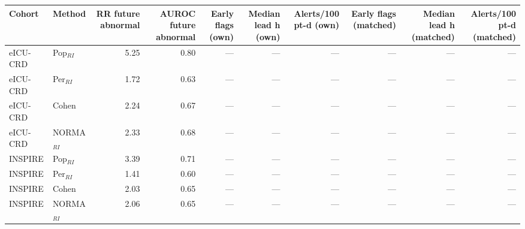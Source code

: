 \begin{table}[ht]
\centering
\scriptsize
\begin{tabular}{llrrrrrrrr}
\toprule
Cohort & Method & RR future abnormal & AUROC future abnormal & Early flags (own) & Median lead h (own) & Alerts/100 pt-d (own) & Early flags (matched) & Median lead h (matched) & Alerts/100 pt-d (matched) \\
\midrule
eICU-CRD & Pop$_{RI}$ & 5.25 & 0.80 & --- & --- & --- & --- & --- & --- \\
eICU-CRD & Per$_{RI}$ & 1.72 & 0.63 & --- & --- & --- & --- & --- & --- \\
eICU-CRD & Cohen & 2.24 & 0.67 & --- & --- & --- & --- & --- & --- \\
eICU-CRD & NORMA$_{RI}$ & 2.33 & 0.68 & --- & --- & --- & --- & --- & --- \\
INSPIRE & Pop$_{RI}$ & 3.39 & 0.71 & --- & --- & --- & --- & --- & --- \\
INSPIRE & Per$_{RI}$ & 1.41 & 0.60 & --- & --- & --- & --- & --- & --- \\
INSPIRE & Cohen & 2.03 & 0.65 & --- & --- & --- & --- & --- & --- \\
INSPIRE & NORMA$_{RI}$ & 2.06 & 0.65 & --- & --- & --- & --- & --- & --- \\
\bottomrule
\end{tabular}
\label{tab:11_lead_time}
\end{table}